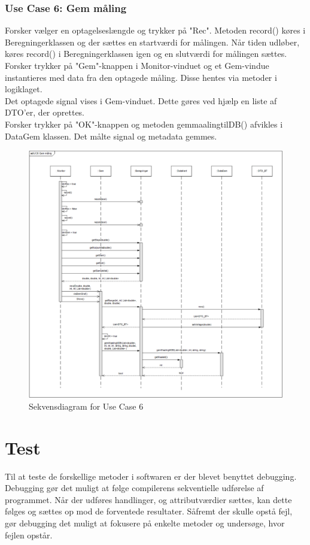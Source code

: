\subsubsection{Use Case 6: Gem måling}
Forsker vælger en optagelseslængde og trykker på "Rec". Metoden record() køres i Beregningerklassen og der sættes en startværdi for målingen.
Når tiden udløber, køres record() i Beregningerklassen igen og en slutværdi for målingen sættes.
Forsker trykker på "Gem"\--knappen i Monitor-vinduet og et Gem-vindue instantieres med data fra den optagede måling. Disse hentes via metoder i logiklaget.\\
Det optagede signal vises i Gem-vinduet. Dette gøres ved hjælp en liste af DTO'er, der oprettes.\\

Forsker trykker på "OK"\--knappen
og metoden gemmaalingtilDB() afvikles i DataGem klassen. Det målte signal og metadata gemmes. 

\begin{figure}[H]
	\centering
	\includegraphics[width=1\textwidth]{Figurer/UC6_SD_SW}
	\caption{Sekvensdiagram for Use Case 6}
\end{figure}

\section{Test}
Til at teste de forskellige metoder i softwaren er der blevet benyttet debugging. Debugging gør det muligt at følge compilerens sekventielle udførelse af programmet. Når der udføres handlinger, og attributværdier sættes, kan dette følges og sættes op mod de forventede resultater. Såfremt der skulle opstå fejl, gør debugging det muligt at fokusere på enkelte metoder og undersøge, hvor fejlen opstår.

